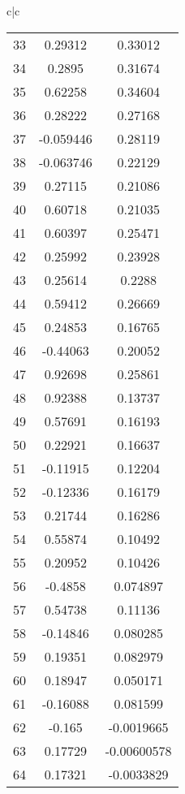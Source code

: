 \begin{tabular}{c|c}
\begin{tabular}{|c|c|c|}
\hline
33 & 0.29312& 0.33012\\ 
34 & 0.2895& 0.31674\\ 
35 & 0.62258 &0.34604\\ 
36 & 0.28222& 0.27168\\ 
37 & -0.059446 &0.28119\\ 
38 & -0.063746& 0.22129\\ 
39 & 0.27115& 0.21086\\ 
40 & 0.60718 &0.21035\\ 
41 & 0.60397 &0.25471\\ 
42 & 0.25992 &0.23928\\ 
43 & 0.25614 &0.2288\\ 
44 & 0.59412& 0.26669\\ 
45 & 0.24853 &0.16765\\ 
46 & -0.44063& 0.20052\\ 
47 & 0.92698& 0.25861\\ 
48 & 0.92388 &0.13737\\ 
49 & 0.57691 &0.16193\\ 
50 & 0.22921 &0.16637\\ 
51 & -0.11915 &0.12204\\ 
52 & -0.12336 &0.16179\\ 
53 & 0.21744 &0.16286\\ 
54 & 0.55874 &0.10492\\ 
55 & 0.20952 &0.10426\\ 
56 & -0.4858 &0.074897\\ 
57 & 0.54738 &0.11136\\ 
58 & -0.14846 &0.080285\\ 
59 & 0.19351 &0.082979\\ 
60 & 0.18947 &0.050171\\ 
61 & -0.16088 &0.081599\\ 
62 & -0.165& -0.0019665\\ 
63 & 0.17729 &-0.00600578\\ 
64 & 0.17321 &-0.0033829\\ 
\hline
\end{tabular}
\end{tabular}
